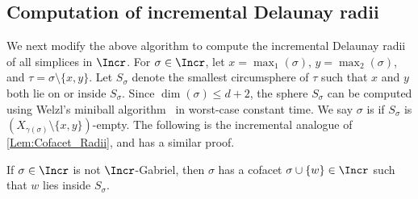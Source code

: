 \subsection{Computation of incremental Delaunay radii}
We next modify the above algorithm to compute the incremental Delaunay radii of
all simplices in $\Incr$.  For $\sigma \in \Incr$, let  $x=\max_1(\sigma)$,
$y=\max_2(\sigma)$, and $\tau=\sigma \setminus \{x, y\}$.  Let $S_{\sigma}$
denote the smallest circumsphere of $\tau$ such that $x$ and $y$ both lie on or
inside $S_{\sigma}$.  Since $\dim(\sigma)\leq d+2$, the sphere $S_{\sigma}$ can be computed using Welzl's
miniball algorithm~\cite{welzlSmallestEnclosingDisks1991} in worst-case constant time.  We say $\sigma$ is  if $S_{\sigma}$ is
$(X_{\gamma(\sigma)}\setminus \{x,y\})$-empty.  
%
The following is the incremental analogue of \cref{Lem:Cofacet_Radii}, and has a similar proof.
%
\begin{lemma}\label{Lem:Incremental_cofacet}
If $\sigma \in \Incr$ is not $\Incr$-Gabriel, then $\sigma$ has a cofacet $\sigma \cup \{w\} \in \Incr$ such that $w$ lies inside $S_{\sigma}$.  
\end{lemma}
%
